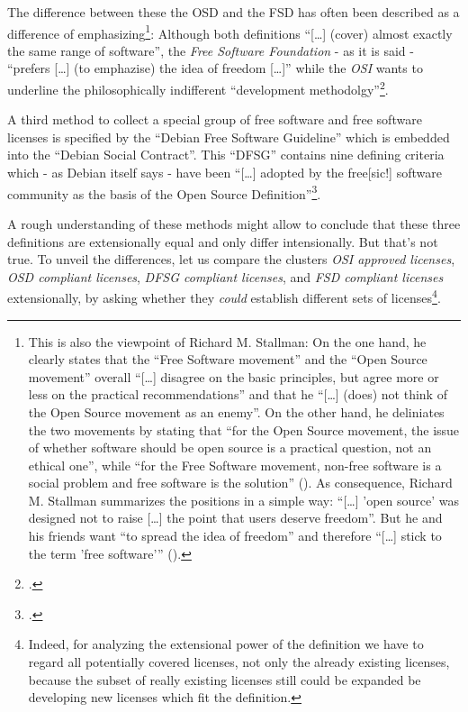 The difference between these the OSD and the FSD has often been described as a
difference of emphasizing\footnote{This is also the viewpoint of Richard M.
Stallman: On the one hand, he clearly states that the \enquote{Free Software
movement} and the \enquote{Open Source movement} overall \enquote{[\ldots]
disagree on the basic principles, but agree more or less on the practical
recommendations} and that he \enquote{[\ldots] (does) not think of the Open
Source movement as an enemy}.  On the other hand, he deliniates the two
movements by stating that \enquote{for the Open Source movement, the issue of
whether software should be open source is a practical question, not an ethical
one}, while \enquote{for the Free Software movement, non-free software is a
social problem and free software is the solution}
(\cite[cf.][55]{Stallman1998a}). \label{RmsFsPriority} As consequence, Richard
M. Stallman summarizes the positions in a simple way: \enquote{[\ldots] 'open
source' was designed not to raise [\ldots] the point that users deserve
freedom}. But he and his friends want \enquote{to spread the idea of freedom}
and therefore \enquote{[\ldots] stick to the term 'free software'}
(\cite[][59]{Stallman1998a}).}: Although both definitions \enquote{[\ldots]
(cover) almost exactly the same range of software}, the \emph{Free Software
Foundation} - as it is said - \enquote{prefers [\ldots] (to emphazise) the idea
of freedom [\ldots]} while the \emph{OSI} wants to underline the philosophically
indifferent \enquote{development methodolgy}\footcite[pars pro toto:
cf.][232]{Fogel2006a}.

A third method to collect a special group of free software and free software
licenses is specified by the \enquote{Debian Free Software Guideline} which is
embedded into the \enquote{Debian Social Contract}. This \enquote{DFSG} contains
nine defining criteria which - as Debian itself says - have been
\enquote{[\ldots] adopted by the free[sic!] software community as the basis of
the Open Source Definition}\footcite[cf.][wp]{DFSG2013a}.

A rough understanding of these methods might allow to conclude that these three
definitions are extensionally equal and only differ intensionally.
But that's not true. To unveil the differences, let us compare the clusters
\emph{OSI approved licenses}, \emph{OSD compliant licenses}, \emph{DFSG
compliant licenses}, and \emph{FSD compliant licenses} extensionally, by asking
whether they \emph{could} establish different sets of licenses\footnote{Indeed,
for analyzing the extensional power of the definition we have to regard all
potentially covered licenses, not only the already existing licenses, because
the subset of really existing licenses still could be expanded be developing new
licenses which fit the definition.}.

